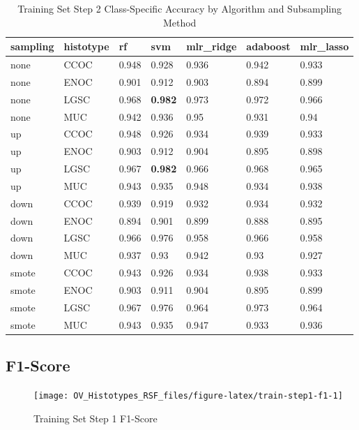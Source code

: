 \documentclass[
]{report}
\begin{document}
\begin{table}

\caption{\label{tab:train-step2-accuracy-class-table}Training Set Step 2 Class-Specific Accuracy by Algorithm and Subsampling Method}
\centering
\begin{tabular}[t]{l|l|l|l|l|l|l}
\hline
sampling & histotype & rf & svm & mlr\_ridge & adaboost & mlr\_lasso\\
\hline
none & CCOC & 0.948 & 0.928 & 0.936 & 0.942 & 0.933\\
\hline
none & ENOC & 0.901 & 0.912 & 0.903 & 0.894 & 0.899\\
\hline
none & LGSC & 0.968 & \textbf{0.982} & 0.973 & 0.972 & 0.966\\
\hline
none & MUC & 0.942 & 0.936 & 0.95 & 0.931 & 0.94\\
\hline
up & CCOC & 0.948 & 0.926 & 0.934 & 0.939 & 0.933\\
\hline
up & ENOC & 0.903 & 0.912 & 0.904 & 0.895 & 0.898\\
\hline
up & LGSC & 0.967 & \textbf{0.982} & 0.966 & 0.968 & 0.965\\
\hline
up & MUC & 0.943 & 0.935 & 0.948 & 0.934 & 0.938\\
\hline
down & CCOC & 0.939 & 0.919 & 0.932 & 0.934 & 0.932\\
\hline
down & ENOC & 0.894 & 0.901 & 0.899 & 0.888 & 0.895\\
\hline
down & LGSC & 0.966 & 0.976 & 0.958 & 0.966 & 0.958\\
\hline
down & MUC & 0.937 & 0.93 & 0.942 & 0.93 & 0.927\\
\hline
smote & CCOC & 0.943 & 0.926 & 0.934 & 0.938 & 0.933\\
\hline
smote & ENOC & 0.903 & 0.911 & 0.904 & 0.895 & 0.899\\
\hline
smote & LGSC & 0.967 & 0.976 & 0.964 & 0.973 & 0.964\\
\hline
smote & MUC & 0.943 & 0.935 & 0.947 & 0.933 & 0.936\\
\hline
\end{tabular}
\end{table}

\hypertarget{f1-score-1}{%
\subsection{F1-Score}\label{f1-score-1}}

\begin{figure}[H]

{\centering \texttt{[image: OV\_Histotypes\_RSF\_files/figure-latex/train-step1-f1-1]} 

}

\caption{Training Set Step 1 F1-Score}\label{fig:train-step1-f1}
\end{figure}
\end{document}
